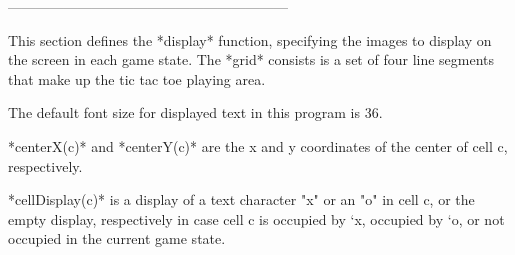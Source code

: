 \documentclass{led_doc}
\begin{document}
\begin{ledDef}
\end{ledDef}

\begin{ledCmnt}
------------------------------------------------------------

This section defines the *display* function, specifying the images to display on the screen in each game state. The  *grid* consists is a set of four line segments that make up the tic tac toe playing area.
\end{ledCmnt}

\begin{ledDef}
\end{ledDef}

\begin{ledCmnt}
The default font size for displayed text in this program is 36.
\end{ledCmnt}

\begin{ledDef}
\end{ledDef}

\begin{ledCmnt}
*centerX(c)* and *centerY(c)* are the x and y coordinates of the center of cell c, respectively.
\end{ledCmnt}

\begin{ledDef}
\end{ledDef}

\begin{ledDef}
\end{ledDef}

\begin{ledCmnt}
*cellDisplay(c)* is a display of a text character "x" or an "o" in cell c, or the empty display, respectively in case cell c is occupied by `x, occupied by `o, or not occupied in the current game state.
\end{ledCmnt}
\end{document}

